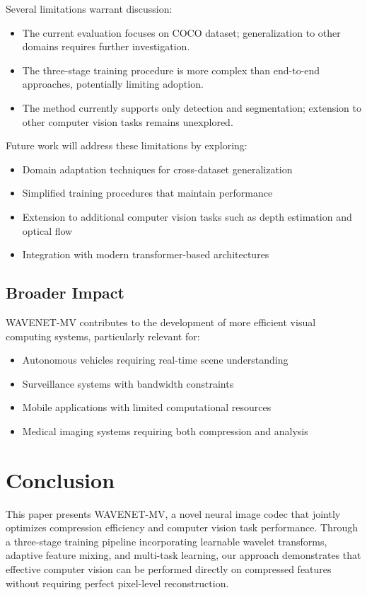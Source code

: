 \documentclass[conference]{IEEEtran}
\begin{document}
Several limitations warrant discussion:

\begin{itemize}
\item The current evaluation focuses on COCO dataset; generalization to other domains requires further investigation.
\item The three-stage training procedure is more complex than end-to-end approaches, potentially limiting adoption.
\item The method currently supports only detection and segmentation; extension to other computer vision tasks remains unexplored.
\end{itemize}

Future work will address these limitations by exploring:
\begin{itemize}
\item Domain adaptation techniques for cross-dataset generalization
\item Simplified training procedures that maintain performance
\item Extension to additional computer vision tasks such as depth estimation and optical flow
\item Integration with modern transformer-based architectures
\end{itemize}

\subsection{Broader Impact}

WAVENET-MV contributes to the development of more efficient visual computing systems, particularly relevant for:
\begin{itemize}
\item Autonomous vehicles requiring real-time scene understanding
\item Surveillance systems with bandwidth constraints
\item Mobile applications with limited computational resources
\item Medical imaging systems requiring both compression and analysis
\end{itemize}

\section{Conclusion}

This paper presents WAVENET-MV, a novel neural image codec that jointly optimizes compression efficiency and computer vision task performance. Through a three-stage training pipeline incorporating learnable wavelet transforms, adaptive feature mixing, and multi-task learning, our approach demonstrates that effective computer vision can be performed directly on compressed features without requiring perfect pixel-level reconstruction.
\end{document}
